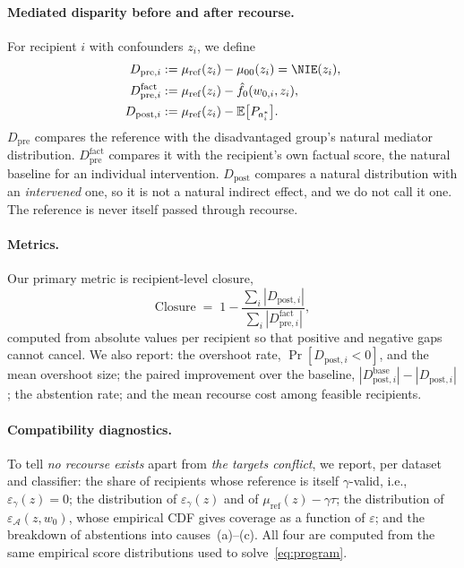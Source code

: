 \paragraph{Mediated disparity before and after recourse.}
For recipient $i$ with confounders $z_i$, we define
\begin{align}
  D_{\mathrm{pre},i}&:=\mu_{\mathrm{ref}}(z_i)-\mu_{00}(z_i)=\NIE(z_i),
  \label{eq:dpre}\\
  D^{\mathrm{fact}}_{\mathrm{pre},i}&:=\mu_{\mathrm{ref}}(z_i)-\hat f_0(w_{0,i},z_i),
  \label{eq:dpre_fact}\\
  D_{\mathrm{post},i}&:=\mu_{\mathrm{ref}}(z_i)-\mathbb E\bigl[P_{a^*_i}\bigr].
  \label{eq:dpost}
\end{align}
$D_{\mathrm{pre}}$ compares the reference with the disadvantaged group's natural
mediator distribution. $D^{\mathrm{fact}}_{\mathrm{pre}}$ compares it with the
recipient's own factual score, the natural baseline for an individual
intervention. $D_{\mathrm{post}}$ compares a natural distribution with an
\emph{intervened} one, so it is not a natural indirect effect, and we do not
call it one. The reference is never itself passed through recourse.

\paragraph{Metrics.}
Our primary metric is recipient-level closure,
\begin{equation}
  \mathrm{Closure}\;=\;1-\frac{\sum_i|D_{\mathrm{post},i}|}
                             {\sum_i|D^{\mathrm{fact}}_{\mathrm{pre},i}|},
  \label{eq:closure}
\end{equation}
computed from absolute values per recipient so that positive and negative
gaps cannot cancel. We also report:
the overshoot rate, $\Pr[D_{\mathrm{post},i}<0]$, and the mean overshoot size;
the paired improvement over the baseline,
$|D^{\mathrm{base}}_{\mathrm{post},i}|-|D_{\mathrm{post},i}|$;
the abstention rate;
and the mean recourse cost among feasible recipients.

\paragraph{Compatibility diagnostics.}
To tell \emph{no recourse exists} apart from \emph{the targets conflict}, we
report, per dataset and classifier:
the share of recipients whose reference is itself $\gamma$-valid, i.e.,
$\varepsilon_\gamma(z)=0$;
the distribution of $\varepsilon_\gamma(z)$ and of
$\mu_{\mathrm{ref}}(z)-\gamma\tau$;
the distribution of $\varepsilon_{\mathcal A}(z,w_0)$, whose empirical CDF gives
coverage as a function of $\varepsilon$;
and the breakdown of abstentions into causes~(a)--(c).
All four are computed from the same empirical score distributions used to
solve~\eqref{eq:program}.
